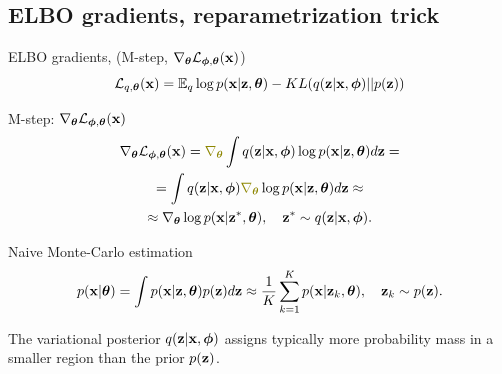 \subsection{ELBO gradients, reparametrization trick}
\begin{frame}{ELBO gradients, (M-step, $\nabla_{\boldsymbol{\theta}} \mathcal{L}_{\boldsymbol{\phi}, \boldsymbol{\theta}}(\mathbf{x})$)}
	\vspace{-0.3cm}
	\[
	 	\mathcal{L}_{q, \boldsymbol{\theta}}(\mathbf{x}) = \mathbb{E}_{q} \log p(\mathbf{x} | \mathbf{z}, \boldsymbol{\theta}) - KL (q(\mathbf{z} | \mathbf{x}, \boldsymbol{\phi}) || p(\mathbf{z}))
	\]
	\vspace{-0.5cm}
	\begin{block}{M-step: $\nabla_{\boldsymbol{\theta}} \mathcal{L}_{\boldsymbol{\phi}, \boldsymbol{\theta}}(\mathbf{x})$}
		\vspace{-0.7cm}
		\begin{multline*}
			\nabla_{\btheta} \cL_{\bphi, \btheta}(\bx)
			= {\color{olive}\nabla_{\btheta}} \int q(\bz|\bx, \bphi) \log p(\bx|\bz, \btheta) d \bz =  \\
			= \int q(\bz|\bx, \bphi) {\color{olive}\nabla_{\btheta}} \log p(\bx|\bz, \btheta) d \bz \approx  \\
			\approx \nabla_{\btheta}\log p(\bx|\bz^*, \btheta), \quad \bz^* \sim q(\bz|\bx, \bphi).
		\end{multline*}
		\vspace{-0.9cm}
	\end{block}
	\begin{block}{Naive Monte-Carlo estimation}
		\vspace{-0.7cm}
		\[
			p(\mathbf{x} | \boldsymbol{\theta}) = \int p(\mathbf{x} | \mathbf{z}, \boldsymbol{\theta}) p(\mathbf{z}) d\mathbf{z} \approx \frac{1}{K} \sum_{k=1}^{K} p(\mathbf{x} | \mathbf{z}_k, \boldsymbol{\theta}), \quad \mathbf{z}_k \sim p(\mathbf{z}).
		\]
		\vspace{-0.5cm} 
	\end{block}
	The variational posterior $q(\mathbf{z}|\mathbf{x}, \boldsymbol{\phi})$ assigns typically more probability mass in a smaller region than the prior $p(\mathbf{z})$. 
\end{frame}
